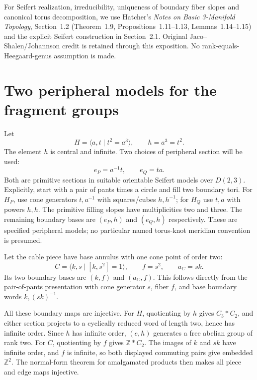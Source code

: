 \documentclass[11pt]{article}
\begin{document}
For Seifert realization, irreducibility, uniqueness of boundary fiber
slopes and canonical torus decomposition, we use Hatcher's
\emph{Notes on Basic 3-Manifold Topology}, Section~1.2
(Theorem~1.9, Propositions~1.11--1.13, Lemmas~1.14--1.15) and the
explicit Seifert construction in Section~2.1. Original
Jaco--Shalen/Johannson credit is retained through this exposition.
No rank-equals-Heegaard-genus assumption is made.

\section{Two peripheral models for the fragment groups}

Let
\[
 H=\langle a,t\mid t^2=a^3\rangle,
 \qquad h=a^3=t^2.
\]
The element $h$ is central and infinite. Two choices of peripheral
section will be used:
\[
 e_P=a^{-1}t,\qquad e_Q=ta.
\]
Both are primitive sections in suitable orientable Seifert models over
$D(2,3)$. Explicitly, start with a pair of pants times a circle and
fill two boundary tori. For $H_P$, use cone generators $t,a^{-1}$ with
squares/cubes $h,h^{-1}$; for $H_Q$ use $t,a$ with powers $h,h$.
The primitive filling slopes have multiplicities two and three.
The remaining boundary bases are $(e_P,h)$ and $(e_Q,h)$ respectively.
These are specified peripheral models; no particular named torus-knot
meridian convention is presumed.

Let the cable piece have base annulus with one cone point of order two:
\[
 C=\langle k,s\mid[k,s^2]=1\rangle,\qquad
 f=s^2,\qquad a_C=sk.
\]
Its two boundary bases are $(k,f)$ and $(a_C,f)$. This follows directly
from the pair-of-pants presentation with cone generator $s$, fiber $f$,
and base boundary words $k,(sk)^{-1}$.

All these boundary maps are injective. For $H$, quotienting by $h$
gives $C_3*C_2$, and either section projects to a cyclically reduced
word of length two, hence has infinite order. Since $h$ has infinite
order, $(e,h)$ generates a free abelian group of rank two. For $C$,
quotienting by $f$ gives $\mathbb Z*C_2$. The images of $k$ and $sk$
have infinite order, and $f$ is infinite, so both displayed commuting
pairs give embedded $\mathbb Z^2$. The normal-form theorem for
amalgamated products then makes all piece and edge maps injective.
\end{document}
